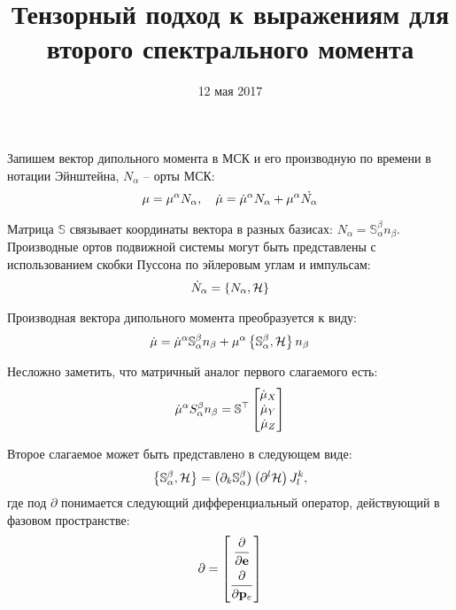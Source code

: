 \documentclass[12pt]{article}
\title{Тензорный подход к выражениям для второго спектрального момента}
\date{12 мая 2017}
\newcommand{\bbS}{\mathbb{S}}
\newcommand{\mH}{\mathcal{H}}
\newcommand{\lb}{\left(}
\newcommand{\rb}{\right)}
\newcommand{\lcb}{\left\{}
\newcommand{\rcb}{\right\}}
\begin{document}
\maketitle

Запишем вектор дипольного момента в МСК и его производную по времени в нотации Эйнштейна, $N_\alpha$ -- орты МСК:
\begin{gather}
	\mu = \mu^\alpha N_\alpha, \quad \dot{\mu} = \dot{\mu}^\alpha N_\alpha + \mu^\alpha \dot{N_\alpha} \notag
\end{gather}

Матрица $\bbS$ связывает координаты вектора в разных базисах: $N_\alpha = \bbS^\beta_\alpha n_\beta$. Производные ортов подвижной системы могут быть представлены с использованием скобки Пуссона по эйлеровым углам и импульсам:
\begin{gather}
	\dot{N}_\alpha = \lcb N_\alpha, \mH \rcb \notag
\end{gather}

Производная вектора дипольного момента преобразуется к виду:
\begin{gather}
	\dot{\mu} = \dot{\mu}^\alpha \bbS^\beta_\alpha n_\beta + \mu^\alpha \lcb \bbS^\beta_\alpha , \mH \rcb n_\beta \notag
\end{gather}

Несложно заметить, что матричный аналог первого слагаемого есть:
\begin{gather}
	\dot{\mu}^\alpha S^\beta_\alpha n_\beta = \bbS^\top 
	\begin{bmatrix}
		\dot{\mu}_X \\
		\dot{\mu}_Y \\
		\dot{\mu}_Z
	\end{bmatrix} \notag
\end{gather}

Второе слагаемое может быть представлено в следующем виде:
\begin{gather}
	\lcb \bbS_\alpha^\beta , \mH \rcb = \lb \partial_k \bbS_\alpha^\beta \rb \lb \partial^l \mH \rb J^{k}_{l}, \notag
\end{gather}
где под $\partial$ понимается следующий дифференциальный оператор, действующий в фазовом пространстве: 
\begin{gather}
	\partial = 
	\begin{bmatrix}
		\dfrac{\strut\partial}{\strut\partial \mathbf{e}} \\
		\dfrac{\strut\partial}{\strut\partial \mathbf{p}_e}
	\end{bmatrix} \notag
\end{gather}
\end{document}
